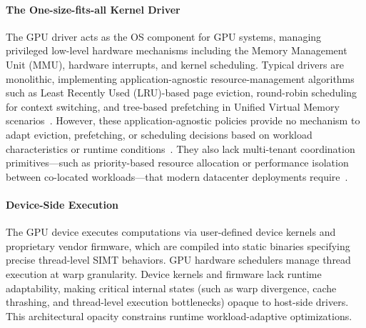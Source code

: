 \paragraph{The One-size-fits-all Kernel Driver}
The GPU driver acts as the OS component for GPU systems, managing privileged low-level hardware mechanisms including the Memory Management Unit (MMU), hardware interrupts, and kernel scheduling. Typical drivers are monolithic, implementing application-agnostic resource-management algorithms such as Least Recently Used (LRU)-based page eviction, round-robin scheduling for context switching, and tree-based prefetching in Unified Virtual Memory scenarios~\cite{gu2020uvmbench,amd-oversubscription}. However, these application-agnostic policies provide no mechanism to adapt eviction, prefetching, or scheduling decisions based on workload characteristics or runtime conditions~\cite{gu2020uvmbench,ravi2021pilot}. They also lack multi-tenant coordination primitives—such as priority-based resource allocation or performance isolation between co-located workloads—that modern datacenter deployments require~\cite{wang2024gcaps,fan2025gpreempt}.


\paragraph{Device-Side Execution}

The GPU device executes computations via user-defined device kernels and proprietary vendor firmware, which are compiled into static binaries specifying precise thread-level SIMT behaviors. GPU hardware schedulers manage thread execution at warp granularity. Device kernels and firmware lack runtime adaptability, making critical internal states (such as warp divergence, cache thrashing, and thread-level execution bottlenecks) opaque to host-side drivers. This architectural opacity constrains runtime workload-adaptive optimizations.

